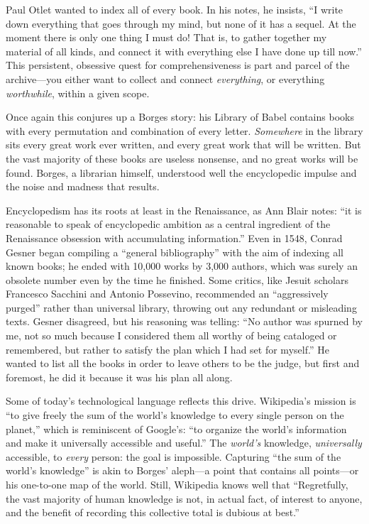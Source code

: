 Paul Otlet wanted to index all of every book. In his notes, he insists, ``I write down everything that goes through my mind, but none of it has a sequel. At the moment there is only one thing I must do! That is, to gather together my material of all kinds, and connect it with everything else I have done up till now.''\autocite[20]{reagle_good_2010} This persistent, obsessive quest for comprehensiveness is part and parcel of the archive---you either want to collect and connect \emph{everything}, or everything \emph{worthwhile}, within a given scope.

Once again this conjures up a Borges story: his Library of Babel contains books with every permutation and combination of every letter. \emph{Somewhere} in the library sits every great work ever written, and every great work that will be written. But the vast majority of these books are useless nonsense, and no great works will be found. Borges, a librarian himself, understood well the encyclopedic impulse and the noise and madness that results.\autocite[112-118]{borges_collected_1999}

Encyclopedism has its roots at least in the Renaissance, as Ann Blair notes: ``it is reasonable to speak of encyclopedic ambition as a central ingredient of the Renaissance obsession with accumulating information.''\autocite[``Information Management in Comparative Perspective'']{blair_too_2010} Even in 1548, Conrad Gesner began compiling a ``general bibliography'' with the aim of indexing all known books; he ended with 10,000 works by 3,000 authors, which was surely an obsolete number even by the time he finished.\autocite[93]{burke_social_2000} Some critics, like Jesuit scholars Francesco Sacchini and Antonio Possevino, recommended an ``aggressively purged'' rather than universal library, throwing out any redundant or misleading texts. Gesner disagreed, but his reasoning was telling: ``No author was spurned by me, not so much because I considered them all worthy of being cataloged or remembered, but rather to satisfy the plan which I had set for myself.''\autocite[``Bibliographies'']{blair_too_2010} He wanted to list all the books in order to leave others to be the judge, but first and foremost, he did it because it was his plan all along.

Some of today's technological language reflects this drive. Wikipedia's mission is ``to give freely the sum of the world's knowledge to every single person on the planet,''\autocite[18]{reagle_good_2010} which is reminiscent of Google's: ``to organize the world's information and make it universally accessible and useful.''\autocite{_company_????} The \emph{world's} knowledge, \emph{universally} accessible, to \emph{every} person: the goal is impossible. Capturing ``the sum of the world's knowledge'' is akin to Borges' aleph---a point that contains all points---or his one-to-one map of the world. Still, Wikipedia knows well that ``Regretfully, the vast majority of human knowledge is not, in actual fact, of interest to anyone, and the benefit of recording this collective total is dubious at best.''\autocite[17]{reagle_good_2010}

